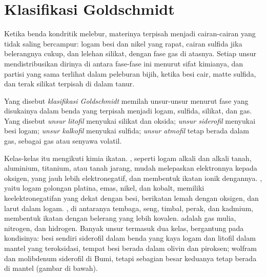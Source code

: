 \section{Klasifikasi Goldschmidt}

Ketika benda kondritik melebur, materinya terpisah menjadi cairan-cairan yang tidak saling
bercampur: logam besi dan nikel yang rapat, cairan sulfida jika belerangnya cukup, dan
lelehan silikat, dengan fase gas di atasnya. Setiap unsur mendistribusikan dirinya di antara
fase-fase ini menurut sifat kimianya, dan partisi yang sama terlihat dalam
peleburan bijih, ketika besi cair, matte sulfida, dan terak silikat terpisah di dalam
tanur.

\begin{definition}
\label{def:b2:elements-in-the-earth:goldschmidt}
Yang disebut \emph{klasifikasi Goldschmidt} memilah
unsur-unsur menurut fase yang disukainya dalam benda yang terpisah menjadi logam,
sulfida, silikat, dan gas. Yang disebut \emph{unsur litofil}
menyukai silikat dan oksida; \emph{unsur siderofil}
menyukai besi logam; \emph{unsur
kalkofil} menyukai sulfida; \emph{unsur
atmofil} tetap berada dalam gas, sebagai gas atau senyawa
volatil.
\end{definition}

Kelas-kelas itu mengikuti kimia ikatan. , seperti logam
alkali dan alkali tanah, aluminium, titanium, atau tanah jarang, mudah
melepaskan elektronnya kepada oksigen, yang jauh lebih elektronegatif, dan
membentuk ikatan ionik dengannya. , yaitu logam golongan platina, emas,
nikel, dan kobalt, memiliki keelektronegatifan yang dekat dengan besi, berikatan lemah
dengan oksigen, dan larut dalam logam. , di antaranya tembaga, seng, timbal,
perak, dan kadmium, membentuk ikatan dengan belerang yang lebih kovalen.
 adalah gas mulia, nitrogen, dan hidrogen. Banyak
unsur termasuk dua kelas, bergantung pada kondisinya: besi sendiri
siderofil dalam benda yang kaya logam dan litofil dalam mantel yang teroksidasi, tempat besi
berada dalam olivin dan piroksen; wolfram dan molibdenum siderofil di
Bumi, tetapi sebagian besar keduanya tetap berada di mantel (gambar di bawah).

